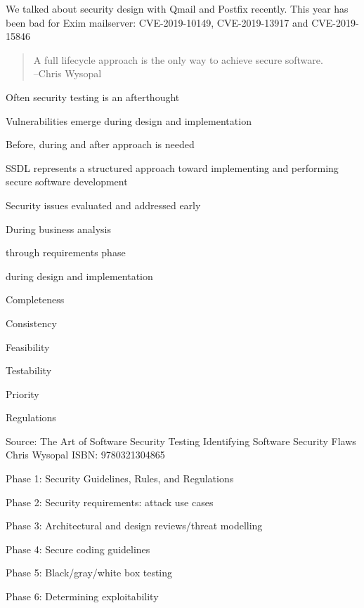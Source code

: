 \documentclass[Screen16to9,17pt]{foils}
\begin{document}
We talked about security design with Qmail and Postfix recently. This year has been bad for Exim mailserver: CVE-2019-10149, CVE-2019-13917 and CVE-2019-15846




\begin{quote}
  A full lifecycle approach is the only way to achieve secure software.\\
  --Chris Wysopal
\end{quote}

\begin{list2}
\item Often security testing is an afterthought
\item Vulnerabilities emerge during design and implementation
\item Before, during and after approach is needed
\end{list2}


\begin{list2}
\item SSDL represents a structured approach toward implementing and performing secure software development
\item Security issues evaluated and addressed early
\item During business analysis
\item through requirements phase
\item during design and implementation
\end{list2}


\begin{list2}
\item Completeness
\item Consistency
\item Feasibility
\item Testability
\item Priority
\item Regulations
\end{list2}

Source: The Art of Software Security Testing Identifying Software Security Flaws
Chris Wysopal ISBN: 9780321304865


\begin{list2}
\item Phase 1: Security Guidelines, Rules, and Regulations
\item Phase 2: Security requirements: attack use cases
\item Phase 3: Architectural and design reviews/threat modelling
\item Phase 4: Secure coding guidelines
\item Phase 5: Black/gray/white box testing
\item Phase 6: Determining exploitability
\end{list2}
\end{document}
